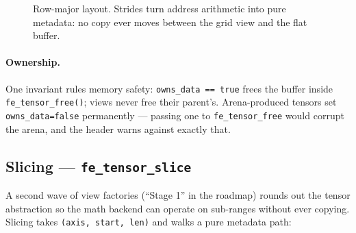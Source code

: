 \documentclass[11pt,a4paper]{article}
\begin{document}
\begin{figure}[h]
\centering
{}
\caption{Row-major layout. Strides turn address arithmetic into pure metadata:
no copy ever moves between the grid view and the flat buffer.}
\label{fig:strides}
\end{figure}

\paragraph{Ownership.} One invariant rules memory safety:
\texttt{owns\_data == true} frees the buffer inside \texttt{fe\_tensor\_free()};
views never free their parent's. Arena-produced tensors set
\texttt{owns\_data=false} permanently --- passing one to \texttt{fe\_tensor\_free}
would corrupt the arena, and the header warns against exactly that.


\subsection{Slicing --- \texttt{fe\_tensor\_slice}}

A second wave of view factories (``Stage 1'' in the roadmap) rounds out the
tensor abstraction so the math backend can operate on sub-ranges without ever
copying. Slicing takes \texttt{(axis, start, len)} and walks a pure metadata
path:
\end{document}
